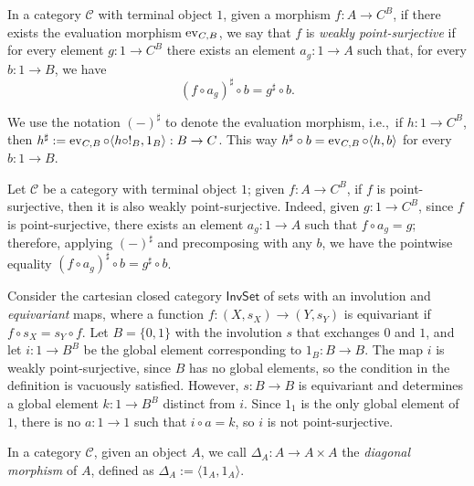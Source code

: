 \begin{definition}
    In a category $\mathcal C$ with terminal object $1$, given a morphism $f : A \to C^B$, if there exists the evaluation morphism $\operatorname{ev}_{C,B}$,
    we say that $f$ is \emph{weakly point-surjective} if for every element $g: 1 \to C^B$ there exists an element $a_g : 1 \to A$ such that, for every $b: 1 \to B$, we have
    \[ (f \circ a_g)^\sharp \circ b = g^\sharp \circ b. \]
\end{definition}

\begin{notation}
    We use the notation $(-)^\sharp$ to denote the evaluation morphism, i.e.,\ if $h : 1 \to C^B$, then $h^\sharp := \operatorname{ev}_{C,B} \circ \langle h \circ !_B, 1_B \rangle : B \to C$.
    This way $h^\sharp \circ b = \operatorname{ev}_{C,B} \circ \langle h,b \rangle$ for every $b: 1 \to B$.
\end{notation}

\begin{remark}
    Let $\mathcal C$ be a category with terminal object $1$; given $f : A \to C^B$, if $f$ is point-surjective, then it is also weakly point-surjective.
    Indeed, given $g: 1 \to C^B$, since $f$ is point-surjective, there exists an element $a_g : 1 \to A$ such that $f \circ a_g = g$; therefore,
    applying $(-)^\sharp$ and precomposing with any $b$, we have the pointwise equality $(f \circ a_g)^\sharp \circ b = g^\sharp \circ b$.
\end{remark}

\begin{example}
    Consider the cartesian closed category $\mathsf{InvSet}$ of sets with an involution and \emph{equivariant} maps, where a function $f : (X,s_X) \to (Y,s_Y)$ is equivariant if $f \circ s_X = s_Y \circ f$. Let $B = \{0,1\}$ with the involution $s$ that exchanges $0$ and $1$, and let $i : 1 \to B^B$ be the global element corresponding to $1_B : B \to B$.
    The map $i$ is weakly point-surjective, since $B$ has no global elements, so the condition in the definition is vacuously satisfied.
    However, $s : B \to B$ is equivariant and determines a global element $k : 1 \to B^B$ distinct from $i$. Since $1_1$ is the only global element of $1$, there is no $a : 1 \to 1$ such that $i \circ a = k$, so $i$ is not point-surjective.
\end{example}

\begin{definition}
    In a category $\mathcal C$, given an object $A$, we call $\Delta_A : A \to A \times A$ the \emph{diagonal morphism} of $A$,
    defined as $\Delta_A := \langle 1_A, 1_A \rangle$.
\end{definition}


